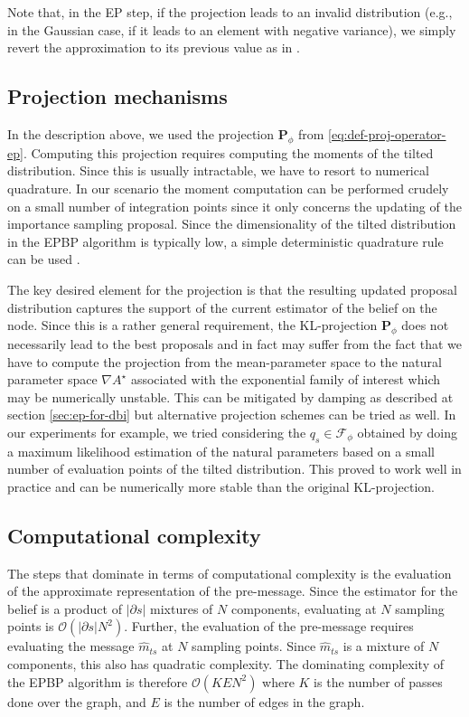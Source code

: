 Note that, in the EP step, if the projection leads to an invalid distribution (e.g., in the Gaussian case, if it leads to an element with negative variance), we simply revert the approximation to its previous value as in \citet{minka01}. 

\subsection{\label{point:epbp-proj}Projection mechanisms}

In the description above, we used the projection $\mathbf P_{\phi}$ from \ref{eq:def-proj-operator-ep}. 
Computing this projection requires computing the moments of the tilted distribution. 
Since this is usually intractable, we have to resort to numerical quadrature. 
In our scenario the moment computation can be performed crudely on a small number of integration points since it only concerns the updating of the importance sampling proposal. 
Since the dimensionality of the tilted distribution in the EPBP algorithm is typically low, a simple deterministic quadrature rule can be used \citep{davis75}. 

The key desired element for the projection is that the resulting updated proposal distribution captures the support of the current estimator of the belief on the node. Since this is a rather general requirement, the KL-projection $\mathbf P_{\phi}$ does not necessarily lead to the best proposals and in fact may suffer from the fact that we have to compute the projection from the mean-parameter space to the natural parameter space $\nabla A^{\star}$ associated with the exponential family of interest which may be numerically unstable.  
This can be mitigated by damping as described at section \ref{sec:ep-for-dbi} but alternative projection schemes can be tried as well.
In our experiments for example, we tried considering the $q_{s}\in\mathcal F_{\phi}$ obtained by doing a maximum likelihood estimation of the natural parameters based on a small number of evaluation points of the tilted distribution. This proved to work well in practice and can be numerically more stable than the original KL-projection.

\subsection{\label{sec:EPBP-compcompl}Computational complexity}
The steps that dominate in terms of computational complexity is the evaluation of the approximate representation of the pre-message.
Since the estimator for the belief is a product of $|\partial s|$ mixtures of $N$ components, evaluating at $N$ sampling points is $\mathcal O(|\partial s|N^{2})$. 
Further, the evaluation of the pre-message requires evaluating the message $\widehat m_{ts}$ at $N$ sampling points. Since $\widehat m_{ts}$ is a mixture of $N$ components, this also has quadratic complexity. The dominating complexity of the EPBP algorithm is therefore $\mathcal O(KEN^{2})$ where $K$ is the number of passes done over the graph, and $E$ is the number of edges in the graph.

